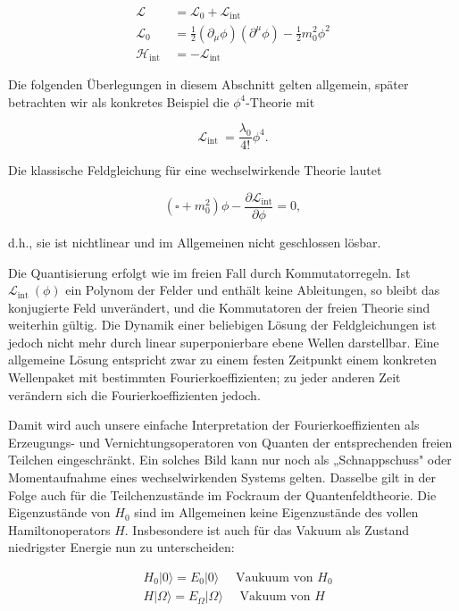 \documentclass[10pt, letterpaper]{article}
\begin{document}
$$
\begin{aligned}
\mathscr{L} & =\mathscr{L}_{0}+\mathscr{L}_{\text {int }} \\
\mathscr{L}_{0} & =\frac{1}{2}\left(\partial_{\mu} \phi\right)\left(\partial^{\mu} \phi\right)-\frac{1}{2} m_{0}^{2} \phi^{2} \\
\mathscr{H}_{\text {int }} & =-\mathscr{L}_{\text {int }}
\end{aligned}
$$

Die folgenden Überlegungen in diesem Abschnitt gelten allgemein, später betrachten wir als konkretes Beispiel die $\phi^{4}$-Theorie mit

$$
\mathscr{L}_{\text {int }}=\frac{\lambda_{0}}{4!} \phi^{4} .
$$

Die klassische Feldgleichung für eine wechselwirkende Theorie lautet

$$
\left(\square+m_{0}^{2}\right) \phi-\frac{\partial \mathscr{L}_{\mathrm{int}}}{\partial \phi}=0,
$$

d.h., sie ist nichtlinear und im Allgemeinen nicht geschlossen lösbar.

Die Quantisierung erfolgt wie im freien Fall durch Kommutatorregeln. Ist $\mathscr{L}_{\text {int }}(\phi)$ ein Polynom der Felder und enthält keine Ableitungen, so bleibt das konjugierte Feld unverändert, und die Kommutatoren der freien Theorie sind weiterhin gültig. Die Dynamik einer beliebigen Lösung der Feldgleichungen ist jedoch nicht mehr durch linear superponierbare ebene Wellen darstellbar. Eine allgemeine Lösung entspricht zwar zu einem festen Zeitpunkt einem konkreten Wellenpaket mit bestimmten Fourierkoeffizienten; zu jeder anderen Zeit verändern sich die Fourierkoeffizienten jedoch.

Damit wird auch unsere einfache Interpretation der Fourierkoeffizienten als Erzeugungs- und Vernichtungsoperatoren von Quanten der entsprechenden freien Teilchen eingeschränkt. Ein solches Bild kann nur noch als „Schnappschuss" oder Momentaufnahme eines wechselwirkenden Systems gelten. Dasselbe gilt in der Folge auch für die Teilchenzustände im Fockraum der Quantenfeldtheorie. Die Eigenzustände von $H_{0}$ sind im Allgemeinen keine Eigenzustände des vollen Hamiltonoperators $H$. Insbesondere ist auch für das Vakuum als Zustand niedrigster Energie nun zu unterscheiden:

$$
\begin{aligned}
& H_{0}|0\rangle=E_{0}|0\rangle \quad \text { Vaukuum von } H_{0} \\
& H|\Omega\rangle=E_{\Omega}|\Omega\rangle \quad \text { Vakuum von } H
\end{aligned}
$$
\end{document}
